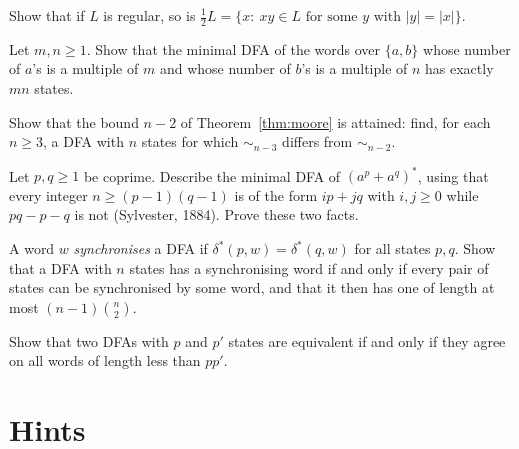 \begin{exercise}[$\star\star$]\label{ex:half}
Show that if $L$ is regular, so is $\tfrac12L=\{x:\ xy\in L\text{ for some }y\text{ with }|y|=|x|\}$.
\end{exercise}

\begin{exercise}[$\star$]\label{ex:countab}
Let $m,n\ge1$. Show that the minimal DFA of the words over $\{a,b\}$ whose number of $a$'s is a multiple of $m$ and whose number of $b$'s is a multiple of $n$ has exactly $mn$ states.
\end{exercise}

\begin{exercise}[$\star\star$]\label{ex:moorebound}
Show that the bound $n-2$ of Theorem~\ref{thm:moore} is attained: find, for each $n\ge3$, a DFA with $n$ states for which $\sim_{n-3}$ differs from $\sim_{n-2}$.
\end{exercise}

\begin{exercise}[$\star\star$]\label{ex:frobenius}
Let $p,q\ge1$ be coprime. Describe the minimal DFA of $(a^p+a^q)^*$, using that every integer $n\ge(p-1)(q-1)$ is of the form $ip+jq$ with $i,j\ge0$ while $pq-p-q$ is not (Sylvester, 1884). Prove these two facts.
\end{exercise}

\begin{exercise}[$\star\star\star$]\label{ex:synchro}
A word $w$ \emph{synchronises} a DFA if $\delta^*(p,w)=\delta^*(q,w)$ for all states $p,q$. Show that a DFA with $n$ states has a synchronising word if and only if every pair of states can be synchronised by some word, and that it then has one of length at most $(n-1)\binom n2$.
\end{exercise}

\begin{exercise}[$\star$]\label{ex:equivbound}
Show that two DFAs with $p$ and $p'$ states are equivalent if and only if they agree on all words of length less than $pp'$.
\end{exercise}

\section{Hints}

